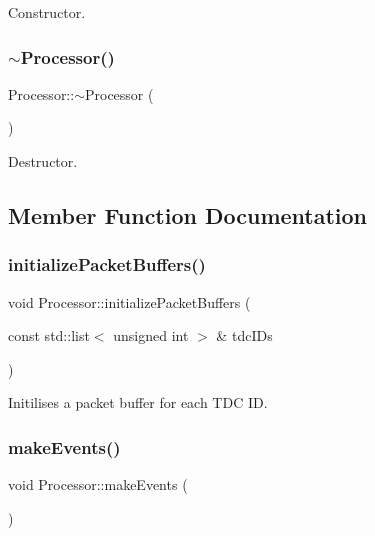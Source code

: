 Constructor. 

\mbox{\label{class_processor_acf37952c5b420d4e903a512571678692}} 
\subsubsection{\texorpdfstring{$\sim$\+Processor()}{~Processor()}}
{\footnotesize\ttfamily Processor\+::$\sim$\+Processor (\begin{DoxyParamCaption}{ }\end{DoxyParamCaption})}



Destructor. 



\subsection{Member Function Documentation}
\mbox{\label{class_processor_aa9ad1e9d6f3d217e23649e42cd07de90}} 
\subsubsection{\texorpdfstring{initialize\+Packet\+Buffers()}{initializePacketBuffers()}}
{\footnotesize\ttfamily void Processor\+::initialize\+Packet\+Buffers (\begin{DoxyParamCaption}\item[{const std\+::list$<$ unsigned int $>$ \&}]{tdc\+I\+Ds }\end{DoxyParamCaption})\hspace{0.3cm}{\ttfamily [private]}}



Initilises a packet buffer for each T\+DC ID. 

\mbox{\label{class_processor_ae06672fc3ac6ef73525b64d4f9f769e7}} 
\subsubsection{\texorpdfstring{make\+Events()}{makeEvents()}}
{\footnotesize\ttfamily void Processor\+::make\+Events (\begin{DoxyParamCaption}{ }\end{DoxyParamCaption})\hspace{0.3cm}{\ttfamily [private]}}




